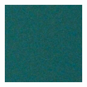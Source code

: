 \begin{figure}
\begin{subfigure}[t]{.24\textwidth}
    \end{subfigure}
    \hfill
    \begin{subfigure}[t]{.24\textwidth}
        \centering
        \includegraphics[width=\linewidth]{figures/film-patch-single.png}
      \end{subfigure}



\end{figure}
